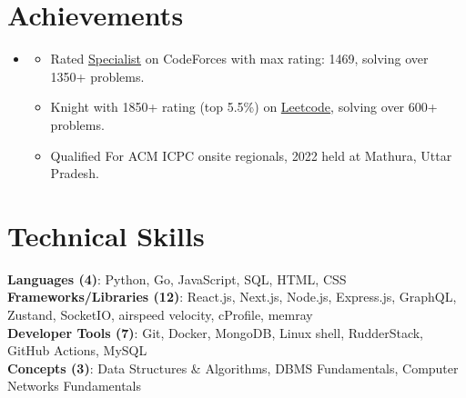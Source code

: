 \documentclass[letterpaper,11pt]{article}
\begin{document}
\section{Achievements}
 \begin{itemize}[leftmargin=0.15in, label={}]
    \item\small{
        \begin{itemize}[leftmargin=0in, itemsep=1pt, topsep=2pt]
            \item {Rated \href{https://codeforces.com/profile/AsishKumar}{Specialist} on CodeForces with max rating: 1469, solving over 1350+ problems.}
            \item {Knight with 1850+ rating (top 5.5\%) on \href{https://leetcode.com/u/openSUSE/}{Leetcode}, solving over 600+ problems.}
            \item {Qualified For ACM ICPC onsite regionals, 2022 held at Mathura, Uttar Pradesh.}
        \end{itemize}
    }
 \end{itemize}


\section{Technical Skills}
 \begin{itemize}[leftmargin=0.15in, label={}]
    \small{\item{
     \textbf{Languages (4)}{: Python, Go, JavaScript, SQL, HTML, CSS} \\
     \textbf{Frameworks/Libraries (12)}{: React.js, Next.js, Node.js, Express.js, GraphQL, Zustand, SocketIO, airspeed velocity, cProfile, memray} \\ 
     \textbf{Developer Tools (7)}{: Git, Docker, MongoDB, Linux shell, RudderStack, GitHub Actions, MySQL} \\ 
     \textbf{Concepts (3)}{: Data Structures \& Algorithms, DBMS Fundamentals, Computer Networks Fundamentals}
    }}
 \end{itemize}


\end{document}
